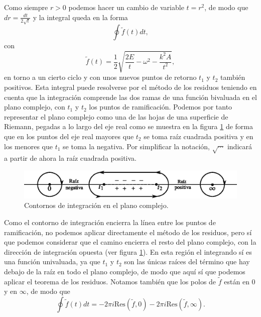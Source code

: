 \documentclass[11pt,a4paper,twoside]{article}
\theoremstyle{definition} \newtheorem{defn}[thm]{Definición}
\theoremstyle{definition} \newtheorem{ejemplo}[thm]{Ejemplo}
\theoremstyle{definition} \newtheorem{ejercicio}[thm]{Ejercicio}
\theoremstyle{remark} \newtheorem*{obs}{Observación}
\begin{document}
Como siempre $r>0$ podemos hacer un cambio de variable $t=r^2$, de modo que $dr=\frac{dt}{2\sqrt{t}}$ y la integral queda en la forma
\begin{equation*}
  \oint \tilde{f}(t) dt,
\end{equation*}
con
\begin{equation}
  \tilde{f}(t)=\frac{1}{2} \sqrt{\frac{2E}{t}-\omega^2-\frac{k^2A}{t^2}}, 
\end{equation}
en torno a un cierto ciclo y con unos nuevos puntos de retorno $t_1$ y $t_2$ también positivos. Esta integral puede resolverse por el método de los residuos teniendo en cuenta que la integración comprende las dos ramas de una función bivaluada en el plano complejo, con $t_1$ y $t_2$ los puntos de ramificación. Podemos por tanto representar el plano complejo como una de las hojas de una superficie de Riemann, pegadas a lo largo del eje real como se muestra en la figura \ref{fig:polos} de forma que en los puntos del eje real mayores que $t_2$ se toma raíz cuadrada positiva y en los menores que $t_1$ se toma la negativa. Por simplificar la notación, $\sqrt{\cdots}$ indicará a partir de ahora la raíz cuadrada positiva. 

\begin{figure}[h]
  \centering
  \includegraphics{polos}
  \caption{\small Contornos de integración en el plano complejo.}
  \label{fig:polos}
\end{figure}

Como el contorno de integración encierra la línea entre los puntos de ramificación, no podemos aplicar directamente el método de los residuos, pero sí que podemos considerar que el camino encierra el resto del plano complejo, con la dirección de integración opuesta (ver figura \ref{fig:polos}). En esta región el integrando sí es una función univaluada, ya que $t_1$ y $t_2$ son las únicas raíces del término que hay debajo de la raíz en todo el plano complejo, de modo que aquí sí que podemos aplicar el teorema de los residuos. Notamos también que los polos de $\tilde{f}$ están en $0$ y en $\infty$, de modo que
\begin{equation}
  \oint \tilde{f}(t)dt =-2\pi i \mathrm{Res}(\tilde{f},0) -2\pi i \mathrm{Res}(\tilde{f},\infty).
\end{equation}
\end{document}
